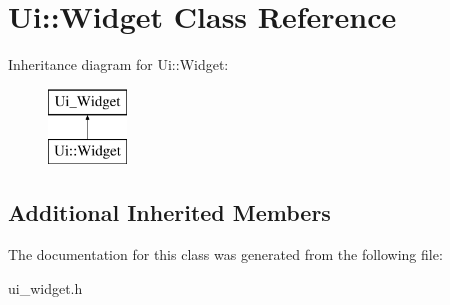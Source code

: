 \hypertarget{class_ui_1_1_widget}{}\section{Ui\+::Widget Class Reference}
\label{class_ui_1_1_widget}
Inheritance diagram for Ui\+::Widget\+:\begin{figure}[H]
\begin{center}
\leavevmode
\includegraphics[height=2.000000cm]{class_ui_1_1_widget}
\end{center}
\end{figure}
\subsection*{Additional Inherited Members}


The documentation for this class was generated from the following file\+:\begin{DoxyCompactItemize}
\item 
ui\+\_\+widget.\+h\end{DoxyCompactItemize}
